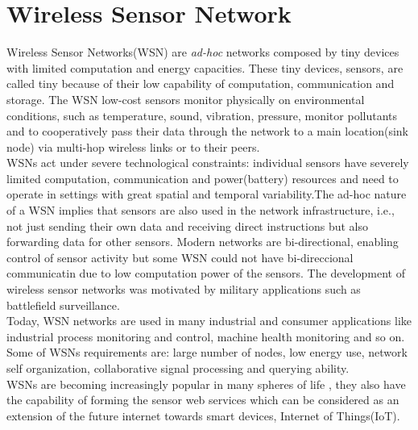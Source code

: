 \section{Wireless Sensor Network}
Wireless Sensor Networks(WSN) are \textit{ad-hoc} networks composed by tiny devices with limited computation and energy capacities. These tiny devices, sensors, are called tiny because of their low capability of computation, communication and storage. The WSN  low-cost sensors monitor physically on environmental conditions, such as temperature, sound, vibration, pressure, monitor pollutants and to cooperatively pass their data through the network to a main location(sink node) via multi-hop wireless links\cite{asad2013survey} or to their peers.\\ 
WSNs act under severe technological constraints: individual sensors have severely limited computation, communication and power(battery) resources and need to operate in settings with great spatial and temporal variability.The ad-hoc nature of a WSN implies that sensors are also used in the network infrastructure, i.e., not just sending their own data and receiving direct instructions but also forwarding data for other sensors. Modern networks are bi-directional, enabling control of sensor activity but some WSN could not have bi-direccional communicatin  due to low computation power of the sensors. The development of wireless sensor networks was motivated by military applications such as battlefield surveillance.\\
Today, WSN networks are used in many industrial and consumer applications like industrial process monitoring and control, machine health monitoring and so on. Some of WSNs requirements are:  large number of nodes, low energy use, network self organization, collaborative signal processing and querying ability.\\
 WSNs are becoming increasingly popular in many spheres of life \cite{castelluccia2005efficient}, they also have the capability of forming the sensor web services which can be considered as an extension of the future internet towards smart devices, Internet of Things(IoT)\cite{asad2013survey}.

